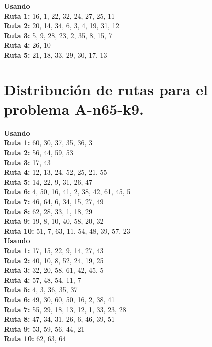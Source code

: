 \documentclass[a4paper,10pt,twocolumn]{article}
\begin{document}
	\textbf{Usando }						 \\
	\textbf{Ruta 1:} 16, 1, 22, 32, 24, 27, 25, 11   \\
	\textbf{Ruta 2:} 20, 14, 34, 6, 3, 4, 19, 31, 12 \\
	\textbf{Ruta 3:} 5, 9, 28, 23, 2, 35, 8, 15, 7   \\
	\textbf{Ruta 4:} 26, 10						     \\
	\textbf{Ruta 5:} 21, 18, 33, 29, 30, 17, 13	     
	
	\section*{Distribución de rutas para el problema A-n65-k9.}
	\label{tab:result65_9}
	
	\hspace{9pt} \textbf{Usando }		 \\
	\textbf{Ruta 1:} 60, 30, 37, 35, 36, 3 	     		 \\
	\textbf{Ruta 2:} 56, 44, 59, 53   			 	     \\
	\textbf{Ruta 3:} 17, 43		 		  				 \\
	\textbf{Ruta 4:} 12, 13, 24, 52, 25, 21, 55	     	 \\
	\textbf{Ruta 5:} 14, 22, 9, 31, 26, 47 				 \\
	\textbf{Ruta 6:} 4, 50, 16, 41, 2, 38, 42, 61, 45, 5 \\
	\textbf{Ruta 7:} 46, 64, 6, 34, 15, 27, 49			 \\
	\textbf{Ruta 8:} 62, 28, 33, 1, 18, 29				 \\
	\textbf{Ruta 9:} 19, 8, 10, 40, 58, 20, 32			 \\
	\textbf{Ruta 10:} 51, 7, 63, 11, 54, 48, 39, 57, 23  \\ 
	
	\textbf{Usando }						   \\
	\textbf{Ruta 1:} 17, 15, 22, 9, 14, 27, 43		   \\
	\textbf{Ruta 2:} 40, 10, 8, 52, 24, 19, 25		   \\
	\textbf{Ruta 3:} 32, 20, 58, 61, 42, 45, 5		   \\
	\textbf{Ruta 4:} 57, 48, 54, 11, 7				   \\
	\textbf{Ruta 5:} 4, 3, 36, 35, 37				   \\
	\textbf{Ruta 6:} 49, 30, 60, 50, 16, 2, 38, 41	   \\
	\textbf{Ruta 7:} 55, 29, 18, 13, 12, 1, 33, 23, 28 \\
	\textbf{Ruta 8:} 47, 34, 31, 26, 6, 46, 39, 51	   \\
	\textbf{Ruta 9:} 53, 59, 56, 44, 21			       \\
	\textbf{Ruta 10:} 62, 63, 64					   
	
\end{document}
